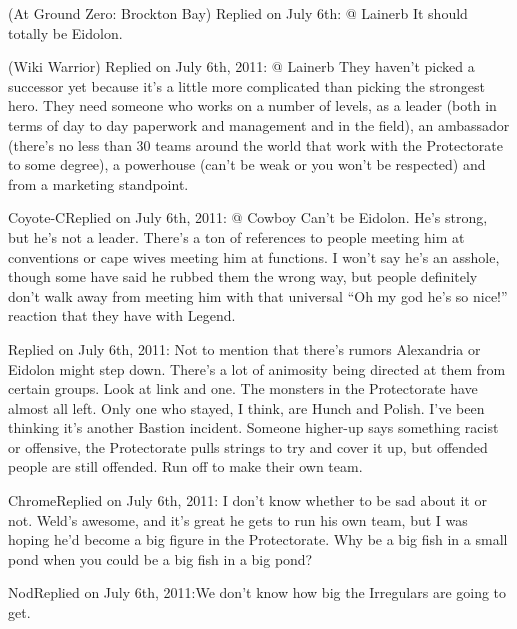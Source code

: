  (At Ground Zero: Brockton Bay)
Replied on July 6th:
@ Lainerb
It should totally be Eidolon.



\blacktriangleright {} (Wiki Warrior)
Replied on July 6th, 2011:
@ Lainerb
They haven't picked a successor yet because it's a little more complicated than picking the strongest hero.  They need someone who works on a number of levels, as a leader (both in terms of day to day paperwork and management and in the field), an ambassador (there's no less than 30 teams around the world that work with the Protectorate to some degree), a powerhouse (can't be weak or you won't be respected) and from a marketing standpoint.



\blacktriangleright Coyote-CReplied on July 6th, 2011:
@ Cowboy
Can't be Eidolon.  He's strong, but he's not a leader.  There's a ton of references to people meeting him at conventions or cape wives meeting him at functions.  I won't say he's an asshole, though some have said he rubbed them the wrong way, but people definitely don't walk away from meeting him with that universal ``Oh my god he's so nice!'' reaction that they have with Legend.



\blacktriangleright {}
Replied on July 6th, 2011:
Not to mention that there's rumors Alexandria or Eidolon might step down.  There's a lot of animosity being directed at them from certain groups.  Look at  link and  one.  The monsters in the Protectorate have almost all left.  Only one who stayed, I think, are Hunch and Polish.  I've been thinking it's another Bastion incident.  Someone higher-up says something racist or offensive, the Protectorate pulls strings to try and cover it up, but offended people are still offended.  Run off to make their own team.



\blacktriangleright ChromeReplied on July 6th, 2011:
I don't know whether to be sad about it or not.  Weld's awesome, and it's great he gets to run his own team, but I was hoping he'd become a big figure in the Protectorate.  Why be a big fish in a small pond when you could be a big fish in a big pond?



\blacktriangleright NodReplied on July 6th, 2011:We don't know how big the Irregulars are going to get.




